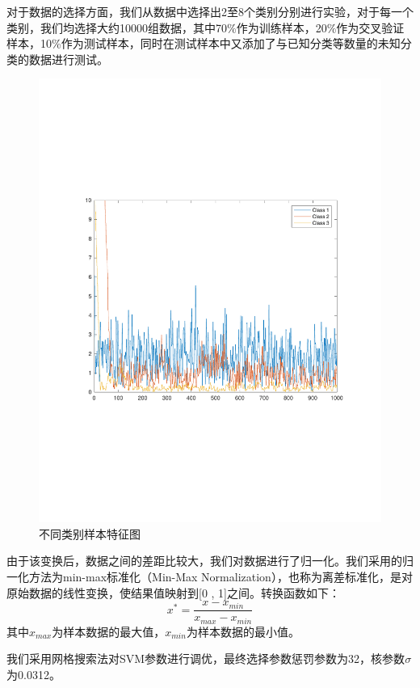 对于数据的选择方面，我们从数据中选择出2至8个类别分别进行实验，对于每一个类别，我们均选择大约10000组数据，其中70\%作为训练样本，20\%作为交叉验证样本，10\%作为测试样本，同时在测试样本中又添加了与已知分类等数量的未知分类的数据进行测试。
\begin{figure}
	\centering
	\includegraphics{figures/diff_data.pdf}
	\caption{不同类别样本特征图}
\end{figure}


由于该变换后，数据之间的差距比较大，我们对数据进行了归一化。我们采用的归一化方法为min-max标准化（Min-Max Normalization），也称为离差标准化，是对原始数据的线性变换，使结果值映射到[0 , 1]之间。转换函数如下：
\begin{equation}
x^{*}=\frac{x-x_{min}}{x_{max}-x_{min}}
\end{equation}
其中$x_{max}$为样本数据的最大值，$x_{min}$为样本数据的最小值。

我们采用网格搜索法对SVM参数进行调优，最终选择参数惩罚参数为32，核参数$\sigma$为0.0312。

